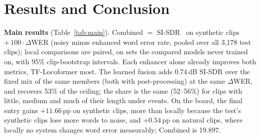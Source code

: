 \documentclass[conference]{IEEEtran}
\begin{document}
\section{Results and Conclusion}
\textbf{Main results} (Table~\ref{tab:main}). Combined $=$ SI-SDR~\cite{sisdr} on synthetic clips $+\,100\cdot\Delta$WER
(noisy minus enhanced word error rate, pooled over all 3,178 test clips); local comparisons are paired, on sets the
compared models never trained on, with 95\% clip-bootstrap intervals. Each enhancer alone already improves both metrics, TF-Locoformer
most. The learned fusion adds 0.74\,dB SI-SDR over the fixed mix of the same members (both with post-processing) at
the same $\Delta$WER, and recovers 53\% of the ceiling; the share is the same (52--56\%) for clips with little, medium and much
of their length under events. On the board, the final entry gains $+11.66$\,pp on synthetic clips, more than locally because the test's
synthetic clips lose more words to noise, and $+0.54$\,pp on natural clips, where locally no system changes word error
measurably; Combined is 19.897.

\begin{table}[t]
\caption{Main results, out of sample (members alone without post-processing; fixed mix and fusion with it), and the
final board entry.}
\label{tab:main}
\centering\scriptsize
\setlength{\tabcolsep}{2.5pt}
\end{table}
\end{document}
